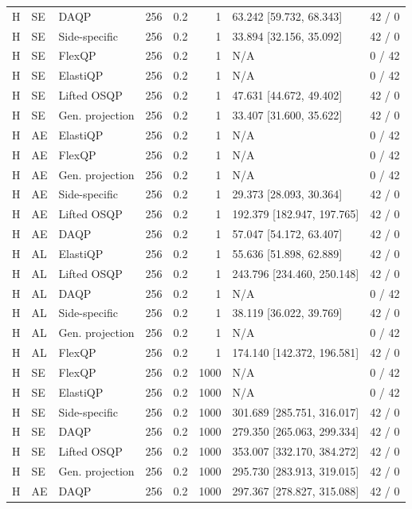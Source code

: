 \begin{longtable}{@{}lllrrrlr@{}}
H & SE & DAQP & 256 & 0.2 & 1 & 63.242 [59.732, 68.343] & 42 / 0 \\
H & SE & Side-specific & 256 & 0.2 & 1 & 33.894 [32.156, 35.092] & 42 / 0 \\
H & SE & FlexQP & 256 & 0.2 & 1 & N/A & 0 / 42 \\
H & SE & ElastiQP & 256 & 0.2 & 1 & N/A & 0 / 42 \\
H & SE & Lifted OSQP & 256 & 0.2 & 1 & 47.631 [44.672, 49.402] & 42 / 0 \\
H & SE & Gen. projection & 256 & 0.2 & 1 & 33.407 [31.600, 35.622] & 42 / 0 \\
H & AE & ElastiQP & 256 & 0.2 & 1 & N/A & 0 / 42 \\
H & AE & FlexQP & 256 & 0.2 & 1 & N/A & 0 / 42 \\
H & AE & Gen. projection & 256 & 0.2 & 1 & N/A & 0 / 42 \\
H & AE & Side-specific & 256 & 0.2 & 1 & 29.373 [28.093, 30.364] & 42 / 0 \\
H & AE & Lifted OSQP & 256 & 0.2 & 1 & 192.379 [182.947, 197.765] & 42 / 0 \\
H & AE & DAQP & 256 & 0.2 & 1 & 57.047 [54.172, 63.407] & 42 / 0 \\
H & AL & ElastiQP & 256 & 0.2 & 1 & 55.636 [51.898, 62.889] & 42 / 0 \\
H & AL & Lifted OSQP & 256 & 0.2 & 1 & 243.796 [234.460, 250.148] & 42 / 0 \\
H & AL & DAQP & 256 & 0.2 & 1 & N/A & 0 / 42 \\
H & AL & Side-specific & 256 & 0.2 & 1 & 38.119 [36.022, 39.769] & 42 / 0 \\
H & AL & Gen. projection & 256 & 0.2 & 1 & N/A & 0 / 42 \\
H & AL & FlexQP & 256 & 0.2 & 1 & 174.140 [142.372, 196.581] & 42 / 0 \\
H & SE & FlexQP & 256 & 0.2 & 1000 & N/A & 0 / 42 \\
H & SE & ElastiQP & 256 & 0.2 & 1000 & N/A & 0 / 42 \\
H & SE & Side-specific & 256 & 0.2 & 1000 & 301.689 [285.751, 316.017] & 42 / 0 \\
H & SE & DAQP & 256 & 0.2 & 1000 & 279.350 [265.063, 299.334] & 42 / 0 \\
H & SE & Lifted OSQP & 256 & 0.2 & 1000 & 353.007 [332.170, 384.272] & 42 / 0 \\
H & SE & Gen. projection & 256 & 0.2 & 1000 & 295.730 [283.913, 319.015] & 42 / 0 \\
H & AE & DAQP & 256 & 0.2 & 1000 & 297.367 [278.827, 315.088] & 42 / 0 \\

\end{longtable}

